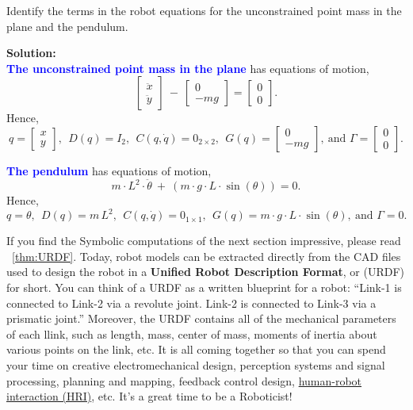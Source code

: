 \bigskip

\begin{exercise} Identify the terms in the robot equations for the unconstrained point mass in the plane and the pendulum.    
\end{exercise}

\textbf{Solution:}\\

\textcolor{blue}{\bf The unconstrained point mass in the plane} has equations of motion,
$$
\left[ \begin{array}{c} \ddot{x} \\ \ddot{y} \end{array} \right] ~- ~\left[ \begin{array}{c} 0 \\ -m g \end{array} \right]
=\left[ \begin{array}{c} 0 \\ 0 \end{array} \right].
$$
Hence, 
$$q =\left[ \begin{array}{c} x \\ y \end{array} \right], ~~D(q) = I_2, ~~C(q, \dot{q}) = 0_{2 \times 2}, ~~G(q) = \left[ \begin{array}{c} 0 \\ -m g \end{array} \right],~ \text{and } \Gamma = \left[ \begin{array}{c} 0 \\ 0 \end{array} \right].$$

\textcolor{blue}{\bf The pendulum} has equations of motion,
$$
m \cdot L^2 \cdot \ddot{\theta}~ +~ \left(m\cdot g\cdot L \cdot \sin(\theta) \right)
=0.
$$
Hence, 
$$q = \theta,    ~~D(q) = m\, L^2, ~~C(q, \dot{q}) = 0_{1 \times 1}, ~~G(q) = m\cdot g\cdot L \cdot \sin(\theta), ~\text{and } \Gamma = 0.$$
\Qed




\begin{rem}
If you find the Symbolic computations of the next section impressive, please read ~\ref{thm:URDF}. Today, robot models can be extracted directly from the CAD files used to design the robot in a \textbf{Unified Robot Description Format}, or (URDF) for short. You can think of a URDF as a written blueprint for a robot: ``Link-1 is connected to Link-2 via a revolute joint. Link-2 is connected to Link-3 via a prismatic joint.'' Moreover, the URDF contains all of the mechanical parameters of each llink, such as length, mass, center of mass, moments of inertia about various points on the link, etc. It is all coming together so that you can spend your time on creative electromechanical design, perception systems and signal processing, planning and mapping, feedback control design, \href{https://en.wikipedia.org/wiki/Human%E2%80%93robot_interaction}{human-robot interaction (HRI)}, etc. It's a great time to be a Roboticist! 
\end{rem}

